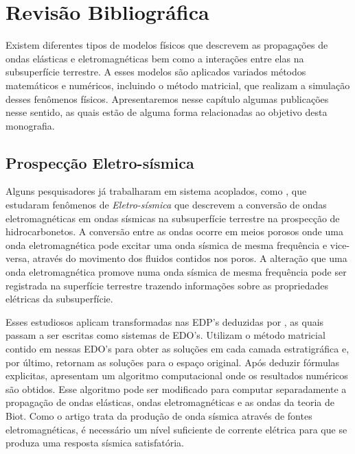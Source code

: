 \chapter{Revis\~ao Bibliogr\'afica}

Existem diferentes tipos de modelos f\'isicos que descrevem as propaga\c{c}\~oes de ondas el\'asticas e eletromagn\'eticas bem como a intera\c{c}\~oes entre elas na subsuperf\'icie terrestre. A esses modelos s\~ao aplicados variados m\'etodos matem\'aticos e num\'ericos, incluindo o m\'etodo matricial, que realizam a simula\c{c}\~ao desses fen\^omenos f\'isicos. Apresentaremos nesse cap\'itulo algumas publica\c{c}\~oes nesse sentido, as quais est\~ao de alguma forma relacionadas ao objetivo desta monografia. 

\section{Prospec\c{c}\~ao Eletro-s\'ismica}

Alguns pesquisadores j\'a trabalharam em sistema acoplados, como \cite{White_Zhou_2006}, que estudaram fen\^omenos de \textit{Eletro-s\'ismica} que descrevem a convers\~ao de ondas eletromagn\'eticas em ondas s\'ismicas na subsuperf\'icie terrestre na prospec\c{c}\~ao de hidrocarbonetos. A convers\~ao entre as ondas ocorre em meios porosos onde uma onda eletromagn\'etica pode excitar uma onda s\'ismica de mesma frequ\^encia e vice-versa, atrav\'es do movimento dos fluidos contidos nos poros. A altera\c{c}\~ao que uma onda eletromagn\'etica promove numa onda s\'ismica de mesma frequ\^encia pode ser registrada na superf\'icie terrestre trazendo informa\c{c}\~oes sobre as propriedades el\'etricas da subsuperf\'icie. 


Esses estudiosos aplicam transformadas nas EDP's deduzidas por \cite{pride_94}, as quais passam a ser escritas como sistemas de EDO's. Utilizam o m\'etodo matricial contido em \cite{Ursin-1983} nessas EDO's para obter as solu\c{c}\~oes em cada camada estratigr\'afica e, por \'ultimo, retornam as solu\c{c}\~oes para o espa\c{c}o original. Ap\'os deduzir f\'ormulas explicitas, apresentam um algoritmo computacional onde os resultados num\'ericos s\~ao obtidos. Esse algoritmo pode ser modificado para computar separadamente a propaga\c{c}\~ao de ondas el\'asticas, ondas eletromagn\'eticas e as ondas da teoria de Biot. Como o artigo trata da produ\c{c}\~ao de onda s\'ismica atrav\'es de fontes eletromagn\'eticas, \'e necess\'ario um n\'ivel suficiente de corrente el\'etrica para que se produza uma resposta s\'ismica satisfat\'oria. 


